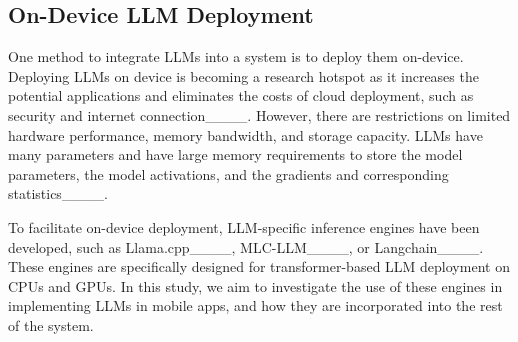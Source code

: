 

 

\subsection{On-Device LLM Deployment}

One method to integrate LLMs into a system is to deploy them on-device. Deploying LLMs on device is becoming a research hotspot as it increases the potential applications and eliminates the costs of cloud deployment, such as security and internet connection____. However, there are restrictions on  limited hardware performance, memory bandwidth, and storage capacity. LLMs have many parameters and have large memory requirements to store the model parameters, the model activations, and the gradients and corresponding statistics____.


To facilitate on-device deployment, LLM-specific inference engines have been developed, such as  Llama.cpp____, MLC-LLM____, or Langchain____. These engines are specifically designed for transformer-based LLM deployment on CPUs and GPUs. 
In this study, we aim to investigate the use of these engines in implementing LLMs in mobile apps, and how they are incorporated into the rest of the system.

